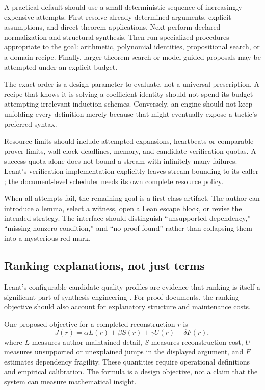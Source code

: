 \documentclass[11pt,letterpaper]{article}
\theoremstyle{remark}
\begin{document}
A practical default should use a small deterministic sequence of increasingly expensive attempts. First resolve already determined arguments, explicit assumptions, and direct theorem applications. Next perform declared normalization and structural synthesis. Then run specialized procedures appropriate to the goal: arithmetic, polynomial identities, propositional search, or a domain recipe. Finally, larger theorem search or model-guided proposals may be attempted under an explicit budget.

The exact order is a design parameter to evaluate, not a universal prescription. A recipe that knows it is solving a coefficient identity should not spend its budget attempting irrelevant induction schemes. Conversely, an engine should not keep unfolding every definition merely because that might eventually expose a tactic's preferred syntax.

Resource limits should include attempted expansions, heartbeats or comparable prover limits, wall-clock deadlines, memory, and candidate-verification quotas. A success quota alone does not bound a stream with infinitely many failures. Leant's verification implementation explicitly leaves stream bounding to its caller \cite{leant-verification}; the document-level scheduler needs its own complete resource policy.

When all attempts fail, the remaining goal is a first-class artifact. The author can introduce a lemma, select a witness, open a Lean escape block, or revise the intended strategy. The interface should distinguish ``unsupported dependency,'' ``missing nonzero condition,'' and ``no proof found'' rather than collapsing them into a mysterious red mark.

\subsection{Ranking explanations, not just terms}

Leant's configurable candidate-quality profiles are evidence that ranking is itself a significant part of synthesis engineering \cite{leant-readme,leant-internals}. For proof documents, the ranking objective should also account for explanatory structure and maintenance costs.

One proposed objective for a completed reconstruction $r$ is
\[
 J(r)=\alpha L(r)+\beta S(r)+\gamma U(r)+\delta F(r),
\]
where $L$ measures author-maintained detail, $S$ measures reconstruction cost, $U$ measures unsupported or unexplained jumps in the displayed argument, and $F$ estimates dependency fragility. These quantities require operational definitions and empirical calibration. The formula is a design objective, not a claim that the system can measure mathematical insight.
\end{document}
